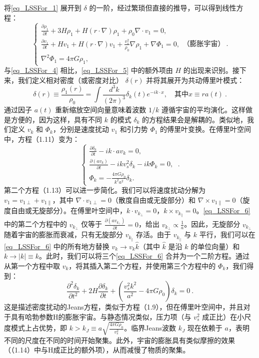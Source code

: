 将\autoref{eq_LSSFor_1} 展开到 \( \delta \) 的一阶，经过繁琐但直接的推导，可以得到线性方程：
\begin{equation}\label{eq_LSSFor_5}\begin{cases} 
\frac{\partial \rho_1}{\partial t} + 3H\rho_1 + H(r \cdot \nabla)\rho_1 + \rho_0\nabla \cdot v_1 = 0, \\
\frac{\partial v_1}{\partial t} + Hv_1 + H(r \cdot \nabla)v_1 + \frac{v_s^2}{\rho_0}\nabla\rho_1 + \nabla\Phi_1 = 0, \\
\nabla^2\Phi_1 = 4\pi G\rho_1,
\end{cases} \text{（膨胀宇宙）} ~.
\end{equation}
与\autoref{eq_LSSFor_4} 相比，\autoref{eq_LSSFor_5} 中的额外项由 $H$ 的出现来识别。接下来，我们定义相对密度（或密度对比） \( \delta(r) \) 并将其展开为共动傅里叶模式：
\[ \delta(r) \equiv \frac{\rho_1(r)}{\rho_0} = \int \frac{d^3k}{(2\pi)^3} \delta_k(t) e^{-ik \cdot x}, \quad \text{其中} x \equiv r a(t)~. \]
通过因子 \( a(t) \) 重新缩放空间向量意味着波数 \( 1/k \) 遵循宇宙的平均演化。这样做是方便的，因为这样，具有不同 \( k \) 的模式 \( \delta_k \) 的方程结果会是解耦的。类似地，我们定义 \( v_k \) 和 \( \Phi_k \)，分别是速度扰动 \( v_1 \) 和引力势 \( \Phi_1 \) 的傅里叶变换。在傅里叶空间中，方程（1.11）变为：
\begin{equation}\label{eq_LSSFor_6} \begin{cases} 
\frac{\partial \delta_k}{\partial t} - ik \cdot a v_k = 0, \\
\frac{\partial (a v_k)}{\partial t} - ik v_s^2 \delta_k - ik \Phi_k = 0, \\
\Phi_k = -\frac{4\pi G \rho_0}{k^2 a^2} \delta_k.
\end{cases} ~.
\end{equation}
第二个方程（1.13）可以进一步简化。我们可以将速度扰动分解为 \( v_1 = v_{1\perp} + v_{1\parallel} \)，其中 \( \nabla \cdot v_{1\perp} = 0 \)（散度自由或无旋部分）和 \( \nabla \times v_{1\parallel} = 0 \)（旋度自由或无旋部分）。在傅里叶空间中，\( k \cdot v_{k_\perp} = 0 \)，\( k \times v_{k_\parallel} = 0 \)。\autoref{eq_LSSFor_6} 中的第二个方程中的 \( v_{k_\perp} \) 仅等于 \( \frac{\partial (a v_{k_\perp})}{\partial t} = 0 \)，给出 \( v_{k_\perp} \propto \frac{1}{a} \)。因此，无旋部分 \( v_{k_\perp} \) 随着宇宙的膨胀而衰减，只有无旋部分 \( v_{k_\parallel} \) 存活。由于 \( v_{k_\parallel} \) 与 \( k \) 平行，我们可以在\autoref{eq_LSSFor_6} 中的所有地方替换 \( v_k \rightarrow v_k \hat{k} \)（其中 \( \hat{k} \) 是沿 \( k \) 的单位向量）和 \( k \rightarrow |k| \equiv k \)。此时，我们可以将三个\autoref{eq_LSSFor_6} 合并为一个二阶方程。通过从第一个方程中取 \( v_k \)，将其插入第二个方程，并使用第三个方程中的 \( \Phi_k \)，我们得到：
\[ \frac{\partial^2 \delta_k}{\partial t^2} + 2H \frac{\partial \delta_k}{\partial t} + \left( \frac{v_s^2 k^2}{a^2} - 4\pi G\rho_0 \right) \delta_k = 0~. \]
这是描述密度扰动的Jeans方程，类似于方程（1.9），但在傅里叶空间中，并且对于具有哈勃参数H的膨胀宇宙。与静态情况类似，压力项（与 \( v_s^2 \) 成正比）在小尺度模式上占优势，即 \( k > k_J \equiv a \sqrt{\frac{4\pi G\rho_0}{v_s^2}} \)。临界Jeans波数 \( k_J \) 现在依赖于 \( a \)，表明不同的尺度在不同的时间开始聚集。此外，宇宙的膨胀具有类似摩擦的效果（（1.14）中与H成正比的额外项），从而减慢了物质的聚集。

